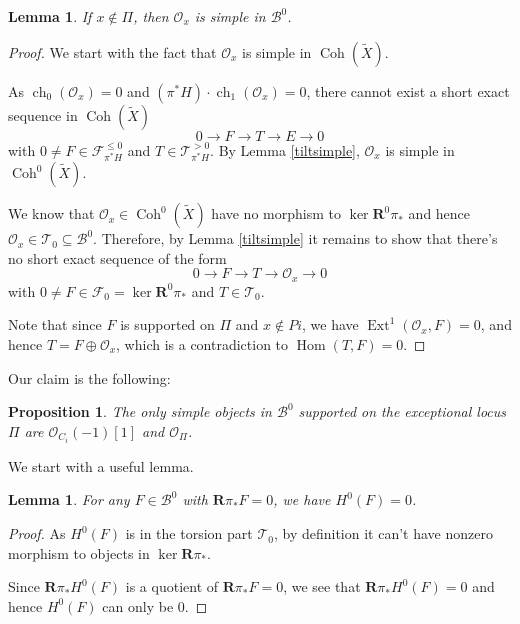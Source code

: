 \documentclass[12pt]{amsart}
\newtheorem{lemma}[theorem]{Lemma}
\newtheorem{proposition}[theorem]{Proposition}
\theoremstyle{definition}
\DeclareMathOperator{\Hom}{Hom}
\DeclareMathOperator{\Ext}{Ext}
\DeclareMathOperator{\Coh}{Coh}
\DeclareMathOperator{\ch}{ch}
\begin{document}
\begin{lemma}\label{Oxsimple}
If $x \notin \Pi$, then $\mathcal{O}_x$ is simple in $\mathcal{B}^0$.
\end{lemma}
\begin{proof}
We start with the fact that $\mathcal{O}_x$ is simple in $\Coh(\widetilde{X})$. 

As $\ch_0(\mathcal{O}_x)=0$ and $(\pi^\ast H) \cdot \ch_1(\mathcal{O}_x)=0$, there cannot exist a short exact sequence in $\Coh(\widetilde{X})$
$$ 0 \longrightarrow F \longrightarrow T \longrightarrow E \longrightarrow 0$$
with $0 \neq F \in \mathcal{F}^{\leq 0}_{\pi^\ast H}$ and $T \in \mathcal{T}^{> 0}_{\pi^\ast H}$.
By Lemma \ref{tiltsimple}, $\mathcal{O}_x$ is simple in $\Coh^0(\widetilde{X})$.

We know that $\mathcal{O}_x \in \Coh^0(\widetilde{X})$ have no morphism to $\ker \mathbf{R}^0 \pi_\ast$ and hence $\mathcal{O}_x \in \mathcal{T}_0 \subseteq \mathcal{B}^0$.
Therefore, by Lemma \ref{tiltsimple} it remains to show that there's no short exact sequence of the form
\[ 0 \longrightarrow F \longrightarrow T \longrightarrow \mathcal{O}_x \longrightarrow 0\]
with $0\neq F \in \mathcal{F}_0=\ker \mathbf{R}^0 \pi_\ast$ and $T\in \mathcal{T}_0$.

Note that  since $F$ is supported on $\Pi$ and $x \notin Pi$, we have $\Ext^1(\mathcal{O}_x, F)=0$,
and hence $T=F \oplus \mathcal{O}_x$, which is a contradiction to $\Hom(T,F)=0$.
\end{proof}

Our claim is the following:

\begin{proposition} \label{simpleobjects}
The only simple objects in $\mathcal{B}^0$ supported on the exceptional locus $\Pi$ are $\mathcal{O}_{C_i}(-1)[1]$ and $\mathcal{O}_{\Pi}$.
\end{proposition}

We start with a useful lemma.

\begin{lemma}\label{H0}
For any $F \in \mathcal{B}^0$ with $\mathbf{R}\pi_\ast F= 0$, we have $H^0(F)=0$. 
\end{lemma}
\begin{proof}
As $H^0(F)$ is in the torsion part $\mathcal{T}_0$, by definition it can't have nonzero morphism to objects in  $\ker \mathbf{R}\pi_\ast$.

Since $\mathbf{R}\pi_\ast H^0(F)$ is a quotient of $\mathbf{R}\pi_\ast F= 0$,
we see that $\mathbf{R}\pi_\ast H^0(F)=0$ and hence $H^0(F)$ can only be $0$.
\end{proof}
\end{document}
